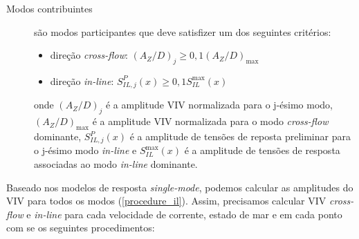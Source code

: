 \begin{description}
	\item [Modos contribuintes] são modos participantes que deve satisfizer um dos seguintes critérios:

        \begin{itemize}
    	\item direção \textit{cross-flow}: ${(A_Z/D)}_j \geq 0,1{(A_Z/D)}_{\max}$

        \item direção \textit{in-line}: $S_{\mathit{IL}, \mathit{j}}^{P}(x) \geq 0,1 S_\mathit{IL}^{\max}(x)$
        \end{itemize}

	onde ${(A_Z/D)}_j$ é a amplitude VIV normalizada para o j-ésimo modo, ${(A_Z/D)}_{\max}$ é a amplitude VIV normalizada para o modo \textit{cross-flow}  dominante, $S_{\mathit{IL}, \mathit{j}}^{P}(x)$ é a amplitude de tensões de reposta preliminar para o j-ésimo modo \textit{in-line} e $S_\mathit{IL}^{\max}(x)$ é a amplitude de tensões de resposta associadas ao modo \textit{in-line} dominante.

\end{description}

Baseado nos modelos de resposta \textit{single-mode}, podemos calcular as amplitudes do VIV para todos os modos (\autoref{procedure_il}).
Assim, precisamos calcular VIV \textit{cross-flow} e \textit{in-line} para cada velocidade de corrente, estado de mar e em cada ponto com se os seguintes procedimentos:

